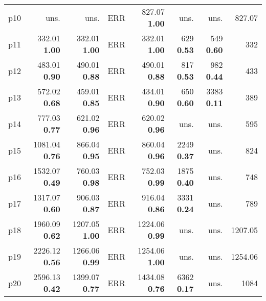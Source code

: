 \begin{tabular}{lrrrrrrr}
\multicolumn{1}{l|}{p10} & uns. & uns. & ERR & {\footnotesize 827.07} \textbf{1.00} & uns. & uns. & \multicolumn{1}{|r}{827.07}\\
\multicolumn{1}{l|}{p11} & {\footnotesize 332.01} \textbf{1.00} & {\footnotesize 332.01} \textbf{1.00} & ERR & {\footnotesize 332.01} \textbf{1.00} & {\footnotesize 629} \textbf{0.53} & {\footnotesize 549} \textbf{0.60} & \multicolumn{1}{|r}{332}\\
\multicolumn{1}{l|}{p12} & {\footnotesize 483.01} \textbf{0.90} & {\footnotesize 490.01} \textbf{0.88} & ERR & {\footnotesize 490.01} \textbf{0.88} & {\footnotesize 817} \textbf{0.53} & {\footnotesize 982} \textbf{0.44} & \multicolumn{1}{|r}{433}\\
\multicolumn{1}{l|}{p13} & {\footnotesize 572.02} \textbf{0.68} & {\footnotesize 459.01} \textbf{0.85} & ERR & {\footnotesize 434.01} \textbf{0.90} & {\footnotesize 650} \textbf{0.60} & {\footnotesize 3383} \textbf{0.11} & \multicolumn{1}{|r}{389}\\
\multicolumn{1}{l|}{p14} & {\footnotesize 777.03} \textbf{0.77} & {\footnotesize 621.02} \textbf{0.96} & ERR & {\footnotesize 620.02} \textbf{0.96} & uns. & uns. & \multicolumn{1}{|r}{595}\\
\multicolumn{1}{l|}{p15} & {\footnotesize 1081.04} \textbf{0.76} & {\footnotesize 866.04} \textbf{0.95} & ERR & {\footnotesize 860.04} \textbf{0.96} & {\footnotesize 2249} \textbf{0.37} & uns. & \multicolumn{1}{|r}{824}\\
\multicolumn{1}{l|}{p16} & {\footnotesize 1532.07} \textbf{0.49} & {\footnotesize 760.03} \textbf{0.98} & ERR & {\footnotesize 752.03} \textbf{0.99} & {\footnotesize 1875} \textbf{0.40} & uns. & \multicolumn{1}{|r}{748}\\
\multicolumn{1}{l|}{p17} & {\footnotesize 1317.07} \textbf{0.60} & {\footnotesize 906.03} \textbf{0.87} & ERR & {\footnotesize 916.04} \textbf{0.86} & {\footnotesize 3331} \textbf{0.24} & uns. & \multicolumn{1}{|r}{789}\\
\multicolumn{1}{l|}{p18} & {\footnotesize 1960.09} \textbf{0.62} & {\footnotesize 1207.05} \textbf{1.00} & ERR & {\footnotesize 1224.06} \textbf{0.99} & uns. & uns. & \multicolumn{1}{|r}{1207.05}\\
\multicolumn{1}{l|}{p19} & {\footnotesize 2226.12} \textbf{0.56} & {\footnotesize 1266.06} \textbf{0.99} & ERR & {\footnotesize 1254.06} \textbf{1.00} & uns. & uns. & \multicolumn{1}{|r}{1254.06}\\
\multicolumn{1}{l|}{p20} & {\footnotesize 2596.13} \textbf{0.42} & {\footnotesize 1399.07} \textbf{0.77} & ERR & {\footnotesize 1434.08} \textbf{0.76} & {\footnotesize 6362} \textbf{0.17} & uns. & \multicolumn{1}{|r}{1084}\\

\end{tabular}
